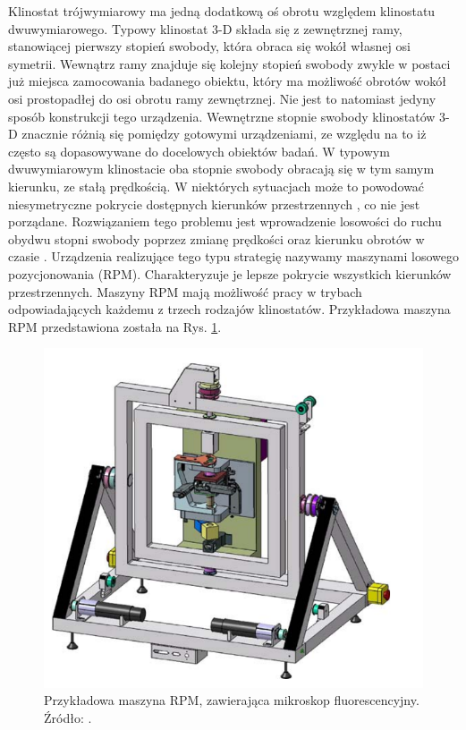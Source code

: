 Klinostat trójwymiarowy ma jedną dodatkową oś obrotu względem klinostatu dwuwymiarowego.
 Typowy klinostat 3-D składa się z zewnętrznej ramy, stanowiącej pierwszy stopień
  swobody, która obraca się wokół własnej osi symetrii. Wewnątrz ramy znajduje się
   kolejny stopień swobody zwykle w postaci już miejsca zamocowania badanego obiektu,
    który ma możliwość obrotów wokół osi prostopadłej do osi obrotu ramy zewnętrznej.
     Nie jest to natomiast jedyny sposób konstrukcji tego urządzenia. Wewnętrzne stopnie
      swobody klinostatów 3-D znacznie różnią się pomiędzy gotowymi urządzeniami, ze
       względu na to iż często są dopasowywane do docelowych obiektów badań. W typowym
        dwuwymiarowym klinostacie oba stopnie swobody obracają się w tym samym kierunku,
         ze stałą prędkością. \linebreak W niektórych sytuacjach może to powodować niesymetryczne
          pokrycie dostępnych kierunków przestrzennych \cite{bib:rpmy}, co nie jest
           porządane. Rozwiązaniem tego problemu jest wprowadzenie losowości do ruchu
            obydwu stopni swobody poprzez zmianę prędkości oraz kierunku obrotów w
             czasie \cite{bib:rpmy}. Urządzenia realizujące tego typu strategię nazywamy
              maszynami losowego pozycjonowania (RPM). Charakteryzuje je lepsze pokrycie
               wszystkich kierunków przestrzennych. Maszyny RPM mają możliwość pracy w trybach
                odpowiadających każdemu z trzech rodzajów klinostatów. Przykładowa
                 maszyna RPM przedstawiona została na Rys. \ref{fig_rpm}.

\begin{figure}
	\centering
	\includegraphics[scale=0.5]{rpm}
	\caption{Przykładowa maszyna RPM, zawierająca mikroskop fluorescencyjny. Źródło: \cite{bib:rpmy}.} 
	\label{fig_rpm}
\end{figure}

